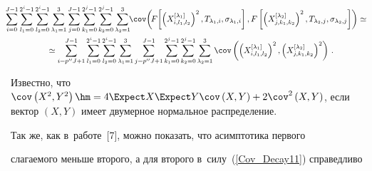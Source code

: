 \begin{multline*}


\hspace*{-2.5mm}\sum\limits_{i = 0}^{J - 1} \sum\limits_{l_1 = 0}^{2^i - 1}


\sum\limits_{l_2 = 0}^{2^i - 1} \sum\limits_{\lambda_1=1}^3


\sum\limits_{j = 0}^{J - 1}\sum\limits_{k_1 = 0}^{2^j - 1}


\sum\limits_{k_2 = 0}^{2^j - 1}\sum\limits_{\lambda_2=1}^3\!\!


\cov\!\left(\!F\!\left[\left(X_{i,l_1,l_2}^{[\lambda_1]}\right)^2,


T_{\lambda_1,i},\sigma_{\lambda_1,i}


\vphantom{(X_{i,l_1,l_2}^{[\lambda_1]})^2}\right],


F\left[\left(X_{j,k_1,k_2}^{[\lambda_2]}\right)^2,T_{\lambda_2,j},\sigma_{\lambda_2,j}\right]\right)


\simeq {}\\


{}\simeq \sum\limits_{i = p''J + 1}^{J - 1} \sum\limits_{l_1 = 0}^{2^i - 1} \sum_{l_2 = 0}^{2^i - 1} \sum_{\lambda_1=1}^3\sum_{j = p''J + 1}^{J - 1}\sum_{k_1 = 0}^{2^j - 1} \sum_{k_2 = 0}^{2^j - 1}\sum_{\lambda_2=1}^3


\cov\left(\left(X_{i,l_1,l_2}^{[\lambda_1]}\right)^2,


\left(X_{j,k_1,k_2}^{[\lambda_2]}\right)^2\right)\,.


\end{multline*}


Известно, что $\cov\left(X^2,Y^2\right) \hm= 4\Expect X\Expect Y \cov\left(X, Y\right) + 2


\cov^2 \left(X, Y\right)$, если вектор $(X,Y)$ имеет двумерное нормальное распределение.


Так же, как в~работе~[7], можно показать, что асимптотика первого


слагаемого меньше второго, а для второго в~силу~(\ref{Cov_Decay11}) справедливо


